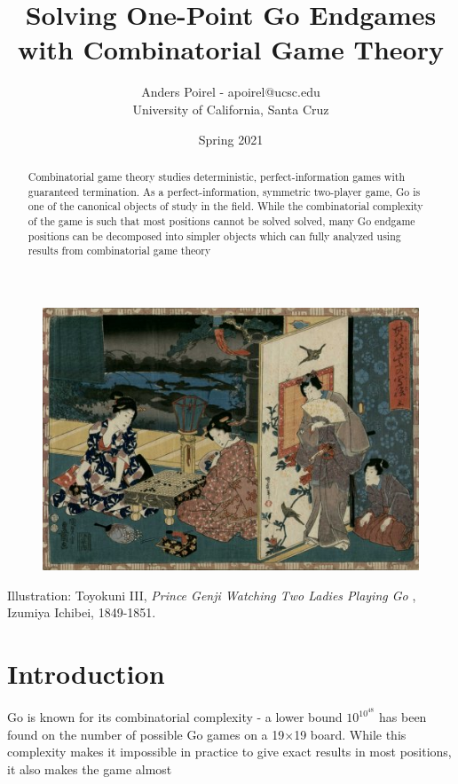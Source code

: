 \documentclass{article}
\title{Solving One-Point Go Endgames with Combinatorial Game Theory}
\author{Anders Poirel - apoirel@ucsc.edu \\ University of California, Santa Cruz}
\date{Spring 2021}
\theoremstyle{plain}
\theoremstyle{definition}
\begin{document}
\maketitle

\begin{figure}[ht]
    \centering
    \includegraphics[width=\textwidth]{final_paper/prince_genji.jpg}
\end{figure}

\begin{abstract}
    Combinatorial game theory studies deterministic, perfect-information 
    games with guaranteed termination. As a perfect-information, symmetric 
    two-player game, Go is one of the canonical objects of study in the field.
    While the combinatorial complexity of the game is such that most positions cannot 
    be solved solved, 
    many Go endgame positions can be decomposed into simpler objects which can fully
    analyzed using results from combinatorial game theory
\end{abstract}

\newpage

Illustration: Toyokuni III, \textit{Prince Genji Watching Two Ladies Playing Go }, 
Izumiya Ichibei, 1849-1851.

\tableofcontents
\newpage 
\section{Introduction}

Go is known for its combinatorial complexity - a lower bound $10^{10^48}$ has 
been found on the number of possible Go games on a 19$\times$19 board. While this complexity 
makes it impossible in practice to give exact results in most positions, it also makes 
the game almost 
\end{document}
